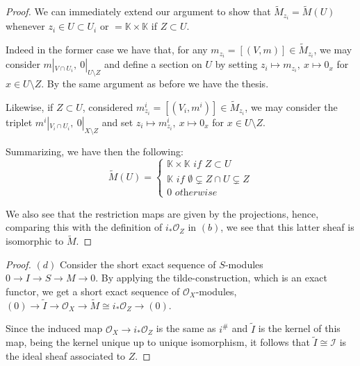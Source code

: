 \documentclass{article}
\newcommand{\numberset}{\mathbb}
\newcommand{\K}{\numberset{K}}
\begin{document}
\begin{proof}
    We can immediately extend our argument to show that
    $\tilde{M}_{z_i}=\tilde{M}(U)$ whenever $z_i\in U\subset U_i$ or
    $=\K\times\K$ if $Z\subset U$.

    Indeed in the former case we have that, for any
    $m_{z_i}=[(V,m)]\in\tilde{M}_{z_i}$, we may consider $m|_{V\cap U_i},\
    0|_{U\setminus Z}$ and define a section on $U$ by
    setting $z_i\mapsto m_{z_i},\ x\mapsto 0_x$ for $x\in U\setminus Z$. By the
    same argument as before we have the thesis.

    Likewise, if $Z\subset U$, considered
    $m^i_{z_i}=[(V_i,m^i)]\in\tilde{M}_{z_i}$, we may consider the triplet
    $m^i|_{V_i\cap U_i},\ 0|_{X\setminus Z}$ and set $z_i\mapsto m^i_{z_i},\
    x\mapsto 0_x$ for $x\in U\setminus Z$.

    Summarizing, we have then the following:
    \[
        \tilde{M}(U)=\begin{cases}
            \K\times\K\textit{ if }Z\subset U \\
            \K\textit{ if }\emptyset\subsetneq Z\cap U\subsetneq Z \\
            0\textit{ otherwise}
        \end{cases}
    \]

    We also see that the restriction maps are given by the projections, hence,
    comparing this with the definition of $i_*\mathcal{O}_Z$ in $(b)$, we see
    that this latter sheaf is isomorphic to $\tilde{M}$.
\end{proof}

\begin{proof}
    $(d)$ Consider the short exact sequence of $S$-modules $0\rightarrow
    I\rightarrow S\rightarrow M\rightarrow 0$. By applying the
    tilde-construction, which is an exact functor, we get a short exact sequence
    of $\mathcal{O}_X$-modules,
    $(0)\rightarrow\tilde{I}\rightarrow\mathcal{O}_X\rightarrow
    \tilde{M}\cong i_*\mathcal{O}_Z\rightarrow (0)$.
    
    Since the induced map $\mathcal{O}_X\rightarrow i_*\mathcal{O}_Z$ is the
    same as $i^\#$ and $\tilde{I}$ is the kernel of this map, being the kernel
    unique up to unique isomorphism, it follows that
    $\tilde{I}\cong\mathcal{I}$ is the ideal sheaf associated to $Z$.
\end{proof}
\end{document}
